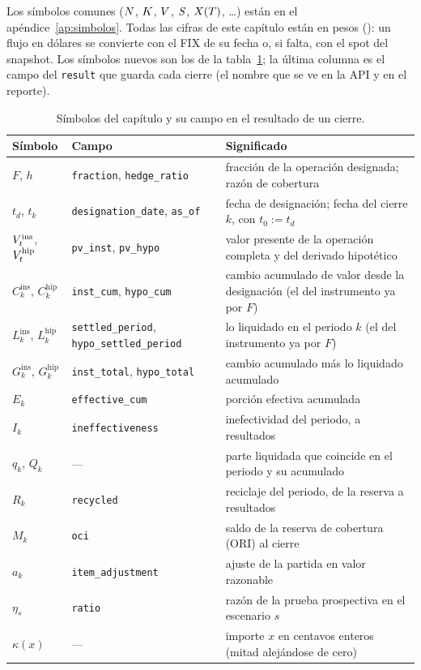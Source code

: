 Los símbolos comunes ($N$, $K$, $V$, $S$, $X(T)$, \dots) están en el apéndice~\ref{ap:simbolos}. Todas las
cifras de este capítulo están en pesos (\MXN): un flujo en dólares se convierte con el FIX de su fecha o, si falta, con
el spot del snapshot. Los símbolos nuevos son los de la tabla~\ref{tab:cap10-simbolos}; la última columna es el campo
del \texttt{result} que guarda cada cierre (el nombre que se ve en la API y en el reporte).

\begin{table}[htb]
  \centering\small
  \caption{Símbolos del capítulo y su campo en el resultado de un cierre.}\label{tab:cap10-simbolos}
  \begin{tabular}{@{}>{\raggedright\arraybackslash}p{}>{\raggedright\arraybackslash}p{}>{\raggedright\arraybackslash}p{}@{}}
    \toprule
    Símbolo & Campo & Significado \\
    \midrule
    $F$, $h$ & \texttt{fraction}, \texttt{hedge\_ratio} & fracción de la operación designada; razón de cobertura \\
    $t_d$, $t_k$ & \texttt{designation\_date}, \texttt{as\_of} & fecha de designación; fecha del cierre $k$, con $t_0:=t_d$ \\
    $V^{\mathrm{ins}}_t$, $V^{\mathrm{hip}}_t$ & \texttt{pv\_inst}, \texttt{pv\_hypo} & valor presente de la operación completa y del derivado hipotético \\
    $C^{\mathrm{ins}}_k$, $C^{\mathrm{hip}}_k$ & \texttt{inst\_cum}, \texttt{hypo\_cum} & cambio acumulado de valor desde la designación (el del instrumento ya por $F$) \\
    $L^{\mathrm{ins}}_k$, $L^{\mathrm{hip}}_k$ & \texttt{settled\_period}, \texttt{hypo\_settled\_period} & lo liquidado en el periodo $k$ (el del instrumento ya por $F$) \\
    $G^{\mathrm{ins}}_k$, $G^{\mathrm{hip}}_k$ & \texttt{inst\_total}, \texttt{hypo\_total} & cambio acumulado más lo liquidado acumulado \\
    $E_k$ & \texttt{effective\_cum} & porción efectiva acumulada \\
    $I_k$ & \texttt{ineffectiveness} & inefectividad del periodo, a resultados \\
    $q_k$, $Q_k$ & --- & parte liquidada que coincide en el periodo y su acumulado \\
    $R_k$ & \texttt{recycled} & reciclaje del periodo, de la reserva a resultados \\
    $M_k$ & \texttt{oci} & saldo de la reserva de cobertura (ORI) al cierre \\
    $a_k$ & \texttt{item\_adjustment} & ajuste de la partida en valor razonable \\
    $\eta_s$ & \texttt{ratio} & razón de la prueba prospectiva en el escenario $s$ \\
    $\kappa(x)$ & --- & importe $x$ en centavos enteros (mitad alejándose de cero) \\
    \bottomrule
  \end{tabular}
\end{table}

